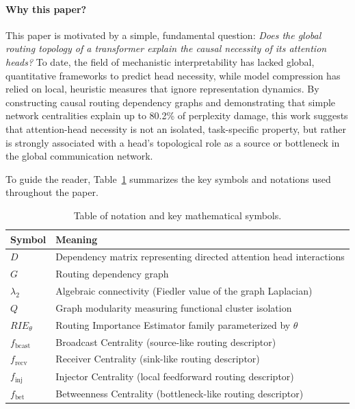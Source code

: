 \documentclass[11pt,a4paper]{article}
\theoremstyle{definition}
\theoremstyle{plain}
\begin{document}
\paragraph{Why this paper?}
This paper is motivated by a simple, fundamental question: \emph{Does the global routing topology of a transformer explain the causal necessity of its attention heads?} To date, the field of mechanistic interpretability has lacked global, quantitative frameworks to predict head necessity, while model compression has relied on local, heuristic measures that ignore representation dynamics. By constructing causal routing dependency graphs and demonstrating that simple network centralities explain up to 80.2\% of perplexity damage, this work suggests that attention-head necessity is not an isolated, task-specific property, but rather is strongly associated with a head's topological role as a source or bottleneck in the global communication network.

To guide the reader, Table~\ref{tab:notation} summarizes the key symbols and notations used throughout the paper.

\begin{table}[h]
\centering
\caption{Table of notation and key mathematical symbols.}
\label{tab:notation}
\begin{tabular}{ll}
\toprule
\textbf{Symbol} & \textbf{Meaning} \\
\midrule
$D$ & Dependency matrix representing directed attention head interactions \\
$G$ & Routing dependency graph \\
$\lambda_2$ & Algebraic connectivity (Fiedler value of the graph Laplacian) \\
$Q$ & Graph modularity measuring functional cluster isolation \\
$RIE_\theta$ & Routing Importance Estimator family parameterized by $\theta$ \\
$f_{\text{bcast}}$ & Broadcast Centrality (source-like routing descriptor) \\
$f_{\text{recv}}$ & Receiver Centrality (sink-like routing descriptor) \\
$f_{\text{inj}}$ & Injector Centrality (local feedforward routing descriptor) \\
$f_{\text{bet}}$ & Betweenness Centrality (bottleneck-like routing descriptor) \\
\bottomrule
\end{tabular}
\end{table}
\end{document}
